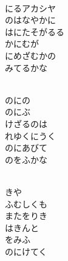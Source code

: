 \documentclass[10pt,b5j]{tarticle} %
\begin{document}
\vspace{1.5em} %
\newcommand{\linespace}{0.5em} %
\newcommand{\blocksize}{0.5\hsize} %
\newcommand{\itemmargin}{3em} %
\begin{enumerate} %
    \setlength{\itemindent}{\itemmargin} %
    \begin{minipage}[c]{\blocksize}
    
        \vspace{\linespace}
        \item~\\
        にるアカシヤ\\
        のはなやかに\\
        はにたそがるる\\
        かにむが\\
        にめざむかの\\
        みてるかな
        
    \end{minipage}
    \begin{minipage}[c]{\blocksize}
        
        \vspace{\linespace}
        \item~\\
        のにの\\
        のにぶ\\
        けざるのは\\
        れゆくにうく\\
        のにあびて\\
        のをふかな
        
    \end{minipage}
    \begin{minipage}[c]{\blocksize}
        
        \vspace{\linespace}
        \item~\\
        きや\\
        ふむしくも\\
        またをりき\\
        はきんと\\
        をみふ\\
        のにけてく
        

\end{minipage}
\end{enumerate}
\end{document}

